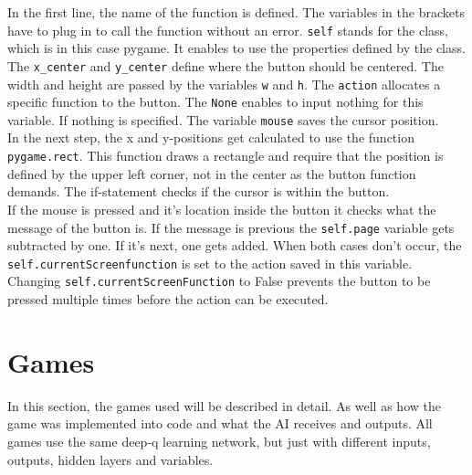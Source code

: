 \documentclass[12pt]{article}
\begin{document}
In the first line, the name of the function is defined. The variables in the brackets have to plug in to call the function without an error.  \lstinline{self} stands for the class, which is in this case pygame. It enables to use the properties defined by the class. \\
The \lstinline{x_center} and  \lstinline{y_center} define where the button should be centered. The width and height are passed by the variables \lstinline{w} and \lstinline{h}. The \lstinline{action} allocates a specific function to the button. The \lstinline{None} enables to \gls{input} nothing for this variable. If nothing is specified. The variable \lstinline{mouse} saves the cursor position. \\
In the next step, the x and y-positions get calculated to use the function \lstinline{pygame.rect}. This function draws a rectangle and require that the position is defined by the upper left corner, not in the center as the button function demands. The if-statement checks if the cursor is within the button. \\
If the mouse is pressed and it's location inside the button it checks what the message of the button is. If the message is previous the \lstinline{self.page} variable gets subtracted by one. If it's next, one gets added. When both cases don't occur, the \lstinline{self.currentScreenfunction} is set to the action saved in this variable. Changing \lstinline{self.currentScreenFunction} to False prevents the button to be pressed multiple times before the action can be executed.


\section{Games}\label{sec:Games}
In this section, the games used will be described in detail. As well as how the game was implemented into code and what the \gls{AI} receives and \glspl{output}. All games use the same deep-q learning network, but just with different  \glspl{input}, \glspl{output}, \glspl{hidden layer} and variables.
\end{document}
